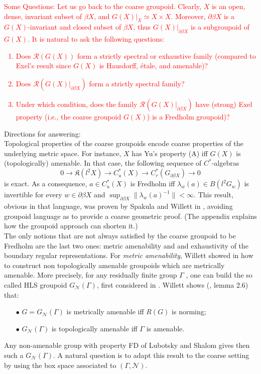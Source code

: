 \documentclass[a4paper]{amsart}
\newcommand\red[1]{\textcolor{red}{#1}}
\newcommand{\maR}{\mathcal R}
\newcommand\<{\langle}
\renewcommand\>{\rangle}
\theoremstyle{definition}
\theoremstyle{remark}
\begin{document}
\smallskip
\red{Some Questions:
Let us go back to the coarse groupoid. Clearly, $X$ is an open, dense, invariant subset of $\beta X$, and $G(X)\big|_{X} \simeq X \times X$.
Moreover, $\partial\beta X$ is a $G(X)$-invariant and closed subset of $\beta X$, thus $G(X)\big|_{\partial \beta X}$ is a subgroupoid of $G(X)$.
It is natural to ask the following questions:
\begin{enumerate}
\item Does $\maR(G(X))$ form a strictly spectral or exhaustive family (compared to Exel's result since $G(X)$ is Hausdorff, \'etale, and amenable)?
\item Does $\maR(G(X)\big|_{\partial \beta X})$ form a strictly spectral family?
\item Under which condition, does the family $\maR(G(X)\big|_{\partial \beta X})$ have (strong) Exel property
(i.e., the coarse groupoid $G(X)$) is a Fredholm groupoid)?
\end{enumerate}
}

Directions for answering:\\

Topological properties of the coarse groupoids encode coarse properties of the underlying metric space. For instance, $X$ has Yu's property (A) iff $G(X)$ is (topologically) amenable. In that case, the following sequence of $C^*$-algebras
\[0 \rightarrow \mathfrak K(l^2 X) \rightarrow C^*_u(X) \rightarrow C_r^*(G_{\partial \beta X}) \rightarrow 0\] 
is exact. As a consequence, $a\in C^*_u(X)$ is Fredholm iff $\lambda_w(a)\in B(l^2 G_w)$ is invertible for every $w\in \partial \beta X$ and $\sup_{\partial \beta X} \| \lambda_w (a)^{-1}\| <\infty$. This result, obvious in that language, was proven by Spakula and Willett in \cite{vspakula2017metric}, avoiding groupoid language as to provide a coarse geometric proof. (The appendix explains how the groupoid approach can shorten it.)\\

The only notions that are not always satisfied by the coarse groupoid to be Fredholm are the last two ones: metric amenability and and exhaustivity of the boundary regular representations. For \textit{metric amenability}, Willett showed in \cite{willett2015non} how to construct non topologically amenable groupoids which are metrically amenable. More precisely, for any residually finite group $\Gamma$ , one can build the so called HLS groupoid $G_{\mathcal N}(\Gamma)$, first considered in \cite{higson2002counterexamples}. Willett shows (\cite{willett2015non}, lemma 2.6) that:
\begin{itemize} 
\item[$\bullet$] $G= G_{\mathcal N}(\Gamma)$ is metrically amenable iff $R(G)$ is norming; 
\item[$\bullet$]$G_{\mathcal N}(\Gamma)$ is topologically amenable iff $\Gamma$ is amenable.
\end{itemize}
Any non-amenable group with property FD of Lubotsky and Shalom gives then such a $G_{\mathcal N}(\Gamma)$. A natural question is to adapt this result to the coarse setting by using the box space associated to $(\Gamma, \mathcal N)$.
\end{document}
